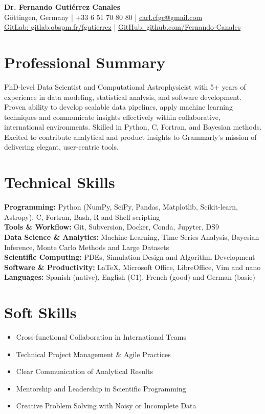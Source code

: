 \documentclass[10pt,a4paper]{article}
\begin{document}
\begin{center}
    {\Huge \textbf{Dr. Fernando Gutiérrez Canales}}\\
    Göttingen, Germany \quad | \quad +33 6 51 70 80 80 \quad | \quad \href{mailto:carl.cfgc@gmail.com}{carl.cfgc@gmail.com} \\
    \href{https://gitlab.obspm.fr/fgutierrez}{GitLab: gitlab.obspm.fr/fgutierrez} \quad | \quad \href{https://github.com/Fernando-Canales}{GitHub: github.com/Fernando-Canales}
\end{center}

\vspace{1em}

\section*{Professional Summary}
PhD-level Data Scientist and Computational Astrophysicist with 5+ years of experience in data modeling, statistical analysis, and software development. Proven ability to develop scalable data pipelines, apply machine learning techniques and communicate insights effectively within collaborative, international environments. Skilled in Python, C, Fortran, and Bayesian methods. Excited to contribute analytical and product insights to Grammarly's mission of delivering elegant, user-centric tools.

\section*{Technical Skills}
\textbf{Programming:} Python (NumPy, SciPy, Pandas, Matplotlib, Scikit-learn, Astropy), C, Fortran, Bash, R and Shell scripting \\
\textbf{Tools \& Workflow:} Git, Subversion, Docker, Conda, Jupyter, DS9 \\
\textbf{Data Science \& Analytics:} Machine Learning, Time-Series Analysis, Bayesian Inference, Monte Carlo Methods and Large Datasets \\
\textbf{Scientific Computing:} PDEs, Simulation Design and Algorithm Development \\
\textbf{Software \& Productivity:} LaTeX, Microsoft Office, LibreOffice, Vim and nano \\
\textbf{Languages:} Spanish (native), English (C1), French (good) and German (basic)

\section*{Soft Skills}
\begin{itemize}[leftmargin=1.5em]
    \item Cross-functional Collaboration in International Teams
    \item Technical Project Management \& Agile Practices
    \item Clear Communication of Analytical Results
    \item Mentorship and Leadership in Scientific Programming
    \item Creative Problem Solving with Noisy or Incomplete Data
\end{itemize}
\end{document}
